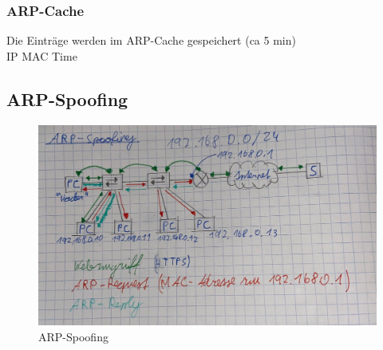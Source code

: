 \subsubsection*{ARP-Cache}
Die Einträge werden im ARP-Cache gespeichert (ca 5 min) \\
IP MAC Time

\subsection*{ARP-Spoofing}
\begin{figure}[H]
	\centering
	\includegraphics[width=1.0\linewidth]{figures/arpspoofing.jpeg}
	\caption{ARP-Spoofing}
\end{figure}





